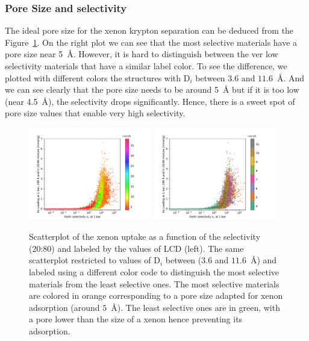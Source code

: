 \documentclass[main.tex]{subfiles}
\begin{document}
\subsubsection{Pore Size and selectivity}

The ideal pore size for the xenon krypton separation can be deduced from the Figure~\ref{fgr:lcd}. On the right plot we can see that the most selective materials have a pore size near \SI{5}{\angstrom}. However, it is hard to distinguish between the ver low selectivity materials that have a similar label color. To see the difference, we plotted with different colors the structures with D$_i$ between $3.6$ and $11.6$~\si{\angstrom}. And we can see clearly that the pore size needs to be around \SI{5}{\angstrom} but if it is too low (near \SI{4.5}{\angstrom}), the selectivity drops significantly. Hence, there is a sweet spot of pore size values that enable very high selectivity.

\begin{figure}[h!]
  \centering
  \includegraphics[width=0.48\textwidth]{figures/2-thermo/Scatterplot_uptake_selectivity_lcd.pdf}
  \includegraphics[width=0.48\textwidth]{figures/2-thermo/Scatterplot_uptake_selectivity_lcd_zoom.pdf}
  \caption{Scatterplot of the xenon uptake as a function of the selectivity (20:80) and labeled by the values of LCD (left). The same scatterplot restricted to values of D$_i$ between ($3.6$ and $11.6$~\si{\angstrom}) and labeled using a different color code to distinguish the most selective materials from the least selective ones. The most selective materials are colored in orange corresponding to a pore size adapted for xenon adsorption (around $5$~\si{\angstrom}). The least selective ones are in green, with a pore lower than the size of a xenon hence preventing its adsorption.}\label{fgr:lcd}
\end{figure}
\end{document}
